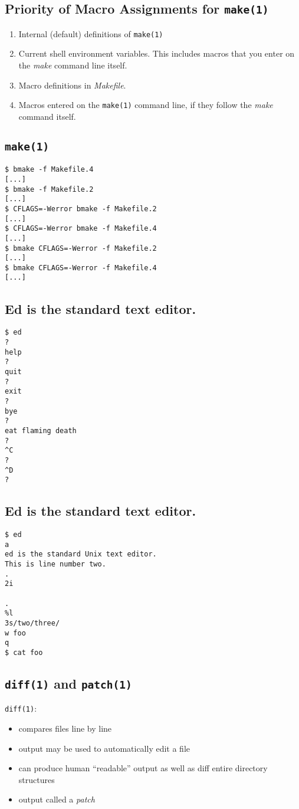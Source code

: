 \documentclass[xga]{xdvislides}
\begin{document}
\subsection{Priority of Macro Assignments for {\tt make(1)}}

\begin{enumerate}
	\item Internal (default) definitions of {\tt make(1)}
	\item Current shell environment variables.  This includes macros that you
		enter on the {\em make} command line itself.
	\item Macro definitions in {\em Makefile}.
	\item Macros entered on the {\tt make(1)} command line, if they follow
		the {\em make} command itself.
\end{enumerate}

\subsection{{\tt make(1)}}

\begin{verbatim}
$ bmake -f Makefile.4
[...]
$ bmake -f Makefile.2
[...]
$ CFLAGS=-Werror bmake -f Makefile.2
[...]
$ CFLAGS=-Werror bmake -f Makefile.4
[...]
$ bmake CFLAGS=-Werror -f Makefile.2
[...]
$ bmake CFLAGS=-Werror -f Makefile.4
[...]
\end{verbatim}

\subsection{Ed is the standard text editor.}
\begin{verbatim}
$ ed
?
help
?
quit
?
exit
?
bye
?
eat flaming death
?
^C
?
^D
?
\end{verbatim}

\subsection{Ed is the standard text editor.}
\begin{verbatim}
$ ed
a
ed is the standard Unix text editor.
This is line number two.
.
2i

.
%l
3s/two/three/
w foo
q
$ cat foo
\end{verbatim}

\subsection{{\tt diff(1)} and {\tt patch(1)}}
{\tt diff(1)}:
\begin{itemize}
	\item compares files line by line
	\item output may be used to automatically edit a file
	\item can produce human ``readable'' output as well as diff entire
		directory structures
	\item output called a {\em patch}
\end{itemize}
\end{document}
